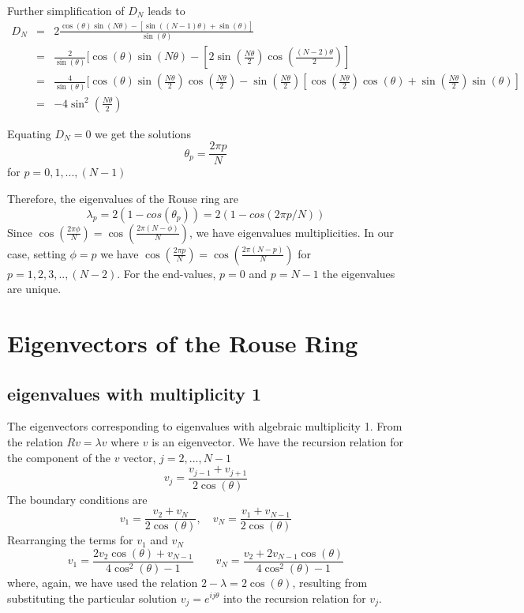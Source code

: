 \documentclass[12pt]{report}
\begin{document}
Further simplification of $D_N$ leads to 
\begin{eqnarray*}
D_N &=& 2\frac{\cos(\theta)\sin(N\theta)-[\sin((N-1)\theta)+\sin(\theta)]}{\sin(\theta)}\\
    &=& \frac{2}{\sin(\theta)}[\cos(\theta)\sin(N\theta)-[2\sin(\frac{N\theta}{2})\cos(\frac{(N-2)\theta}{2})]\\
    &=& \frac{4}{\sin(\theta)}[\cos(\theta)\sin(\frac{N\theta}{2})\cos(\frac{N\theta}{2})-\sin(\frac{N\theta}{2})[\cos(\frac{N\theta}{2})\cos(\theta)+\sin(\frac{N\theta}{2})\sin(\theta)]\\
    &=& -4\sin^2(\frac{N\theta}{2})
\end{eqnarray*}

Equating $D_N=0$ we get the solutions
\begin{equation*}
\theta_p=\frac{2\pi p}{N}
\end{equation*}
for $p=0,1,...,(N-1)$

Therefore, the eigenvalues of the Rouse ring are 
\begin{equation*}
\lambda_p=2(1-cos(\theta_p))= 2(1-cos(2\pi p/N))
\end{equation*}
Since $\cos(\frac{2\pi \phi}{N})=\cos(\frac{2\pi(N-\phi)}{N})$, we have eigenvalues multiplicities. In our case, setting $\phi=p$ we have $\cos(\frac{2\pi p}{N})=\cos(\frac{2\pi(N-p)}{N})$ for $p=1,2,3,..,(N-2)$. For the end-values, $p=0$ and $p=N-1$ the eigenvalues are unique. 



\section{Eigenvectors of the Rouse Ring}\label{eigenvectorsOfTheRouseRing}
\subsection{eigenvalues with multiplicity 1}\label{subsection_eigenvaluesWithMultiplicity1}
The eigenvectors corresponding to eigenvalues with algebraic multiplicity 1. From the relation $Rv=\lambda v$ where $v$  is an eigenvector.
We have the recursion relation for the component of the $v$ vector, $j=2,...,N-1$
\begin{equation*}
v_j = \frac{v_{j-1}+v_{j+1}}{2\cos(\theta)}
\end{equation*}
The boundary conditions are 
\begin{equation*}
v_1 = \frac{v_2+v_N}{2\cos(\theta)},\quad v_N = \frac{v_1+v_{N-1}}{2\cos(\theta)}
\end{equation*}
Rearranging the terms for $v_1$ and $v_N$
\begin{equation*}
v_1 = \frac{2v_2\cos(\theta)+v_{N-1}}{4\cos^2(\theta)-1}\qquad v_N = \frac{v_2+2v_{N-1}\cos(\theta)}{4\cos^2(\theta)-1}
\end{equation*}
where, again, we have used the relation $2-\lambda = 2\cos(\theta)$, resulting from substituting the particular solution $v_j=e^{ij\theta}$ into the recursion relation for $v_j$. 
\end{document}
